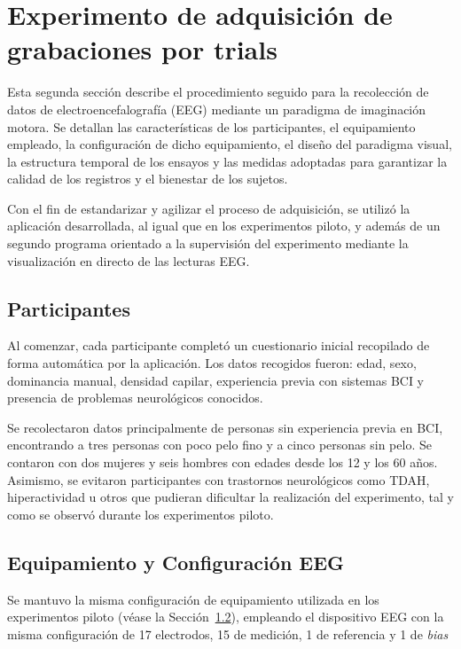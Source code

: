 \section{Experimento de adquisición de grabaciones por trials}
\label{sec:protocoloAdquisicion}

Esta segunda sección describe el procedimiento seguido para la recolección de datos de electroencefalografía (EEG) mediante un paradigma de imaginación motora. Se detallan las características de los participantes, el equipamiento empleado, la configuración de dicho equipamiento, el diseño del paradigma visual, la estructura temporal de los ensayos y las medidas adoptadas para garantizar la calidad de los registros y el bienestar de los sujetos.

Con el fin de estandarizar y agilizar el proceso de adquisición, se utilizó la aplicación desarrollada, al igual que en los experimentos piloto, y además de un segundo programa orientado a la supervisión del experimento mediante la visualización en directo de las lecturas EEG.

\subsection{Participantes}
\label{subsec:participantes}

Al comenzar, cada participante completó un cuestionario inicial recopilado de forma automática por la aplicación. Los datos recogidos fueron: edad, sexo, dominancia manual, densidad capilar, experiencia previa con sistemas BCI y presencia de problemas neurológicos conocidos.

Se recolectaron datos principalmente de personas sin experiencia previa en BCI, encontrando a tres personas con poco pelo fino y a cinco personas sin pelo. 
Se contaron con dos mujeres y seis hombres con edades desde los 12 y los 60 años. Asimismo, se evitaron participantes con trastornos neurológicos como TDAH, hiperactividad u otros que pudieran dificultar la realización del experimento, tal y como se observó durante los experimentos piloto.

\subsection{Equipamiento y Configuración EEG}
\label{subsec:equipamiento}

Se mantuvo la misma configuración de equipamiento utilizada en los experimentos piloto (véase la Sección~\ref{subsec:equipamiento}), empleando el dispositivo EEG con la misma configuración de 17 electrodos, 15 de medición, 1 de referencia y 1 de \textit{bias}

